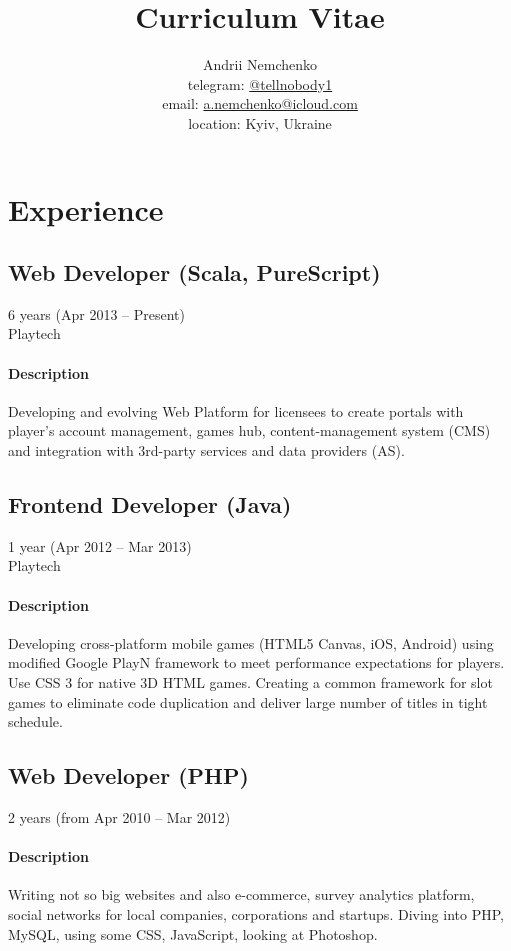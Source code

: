\documentclass{article}
\begin{document}
	\title{Curriculum Vitae}
	\author{
		Andrii Nemchenko\\
		telegram: \href{https://t.me/tellnobody1}{@tellnobody1}\\
		email: \href{mailto:a.nemchenko@icloud.com}{a.nemchenko@icloud.com}\\
		location: Kyiv, Ukraine
	}
	\maketitle
	\section{Experience}
	\subsection{Web Developer (Scala, PureScript)}
	6 years (Apr 2013 – Present)\\
	Playtech
	\paragraph{Description}
	Developing and evolving Web Platform for licensees to create portals with player's account management, games hub, content-management system (CMS) and integration with 3rd-party services and data providers (AS).
	\subsection{Frontend Developer (Java)}
	1 year (Apr 2012 – Mar 2013)\\Playtech
	\paragraph{Description}
	Developing cross-platform mobile games (HTML5 Canvas, iOS, Android) using modified Google PlayN framework to meet performance expectations for players. Use CSS 3 for native 3D HTML games. Creating a common framework for slot games to eliminate code duplication and deliver large number of titles in tight schedule.
	\subsection{Web Developer (PHP)}
	2 years (from Apr 2010 – Mar 2012)
	\paragraph{Description}
	Writing not so big websites and also e-commerce, survey analytics platform, social networks for local companies, corporations and startups. Diving into PHP, MySQL, using some CSS, JavaScript, looking at Photoshop.
\end{document}
